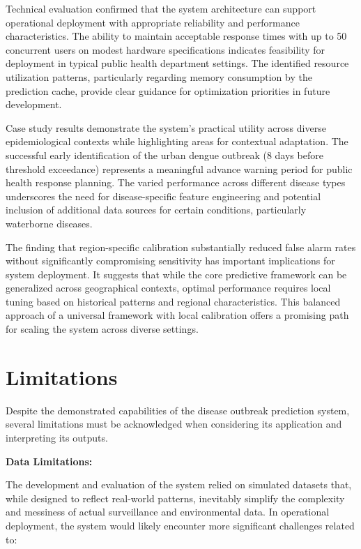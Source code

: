 \documentclass[12pt,a4paper]{report}
\begin{document}
Technical evaluation confirmed that the system architecture can support operational deployment with appropriate reliability and performance characteristics. The ability to maintain acceptable response times with up to 50 concurrent users on modest hardware specifications indicates feasibility for deployment in typical public health department settings. The identified resource utilization patterns, particularly regarding memory consumption by the prediction cache, provide clear guidance for optimization priorities in future development.

Case study results demonstrate the system's practical utility across diverse epidemiological contexts while highlighting areas for contextual adaptation. The successful early identification of the urban dengue outbreak (8 days before threshold exceedance) represents a meaningful advance warning period for public health response planning. The varied performance across different disease types underscores the need for disease-specific feature engineering and potential inclusion of additional data sources for certain conditions, particularly waterborne diseases.

The finding that region-specific calibration substantially reduced false alarm rates without significantly compromising sensitivity has important implications for system deployment. It suggests that while the core predictive framework can be generalized across geographical contexts, optimal performance requires local tuning based on historical patterns and regional characteristics. This balanced approach of a universal framework with local calibration offers a promising path for scaling the system across diverse settings.

\section{Limitations}
Despite the demonstrated capabilities of the disease outbreak prediction system, several limitations must be acknowledged when considering its application and interpreting its outputs.

\textbf{Data Limitations:}

The development and evaluation of the system relied on simulated datasets that, while designed to reflect real-world patterns, inevitably simplify the complexity and messiness of actual surveillance and environmental data. In operational deployment, the system would likely encounter more significant challenges related to:
\end{document}
